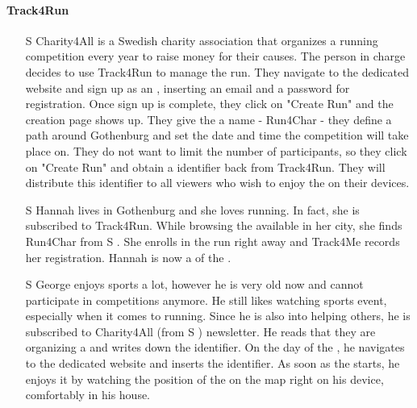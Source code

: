 \documentclass[../../rasd.tex]{subfiles}
\begin{document}
                \paragraph{Track4Run}
                \begin{itemize}
                    \item[S\subs{8}] Charity4All is a Swedish charity association that organizes a running competition every year to raise money for their causes. The person in charge decides to use Track4Run to manage the run. They navigate to the  dedicated website and sign up as an , inserting an email and a password for registration. Once sign up is complete, they click on "Create Run" and the  creation page shows up. They give the  a name - Run4Char - they define a path around Gothenburg and set the date and time the competition will take place on. They do not want to limit the number of participants, so they click on "Create Run" and obtain a  identifier back from Track4Run. They will distribute this identifier to all viewers who wish to enjoy the  on their devices.

                    \item[S\subs{9}] Hannah lives in Gothenburg and she loves running. In fact, she is subscribed to Track4Run. While browsing the available  in her city, she finds Run4Char from S . She enrolls in the run right away and Track4Me records her registration. Hannah is now a  of the .  

                    \item[S\subs{10}] George enjoys sports a lot, however he is very old now and cannot participate in competitions anymore. He still likes watching sports event, especially when it comes to running. Since he is also into helping others, he is subscribed to Charity4All (from S ) newsletter. He reads that they are organizing a  and writes down the  identifier. On the day of the , he navigates to the  dedicated website and inserts the  identifier. As soon as the  starts, he enjoys it by watching the position of the  on the map right on his device, comfortably in his house.
                \end{itemize}
\end{document}
